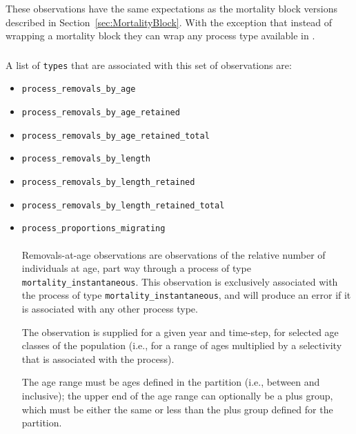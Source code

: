 These observations have the same expectations as the mortality block versions described in Section~\ref{sec:MortalityBlock}. With the exception that instead of wrapping a mortality block they can wrap any process type available in \CNAME.

\subsubsection{}

A list of \texttt{types} that are associated with this set of observations are:

\begin{itemize}
	\item \texttt{process\_removals\_by\_age}
	\item \texttt{process\_removals\_by\_age\_retained}
	\item \texttt{process\_removals\_by\_age\_retained\_total}
	\item \texttt{process\_removals\_by\_length}
	\item \texttt{process\_removals\_by\_length\_retained}
	\item \texttt{process\_removals\_by\_length\_retained\_total}
	\item \texttt{process\_proportions\_migrating}

\paragraph*{\label{sec:removals-by-age}}\label{sec:Observation-ProcessRemovalsByAge}

Removals-at-age observations are observations of the relative number of individuals at age, part way through a process of type \texttt{mortality\_instantaneous}. This observation is exclusively associated with the process of type \texttt{mortality\_instantaneous}, and will produce an error if it is associated with any other process type.

The observation is supplied for a given year and time-step, for selected age classes of the population (i.e., for a range of ages multiplied by a selectivity that is associated with the process).

The age range must be ages defined in the partition (i.e., between  and  inclusive); the upper end of the age range can optionally be a plus group, which must be either the same or less than the plus group defined for the partition.


\end{itemize}
